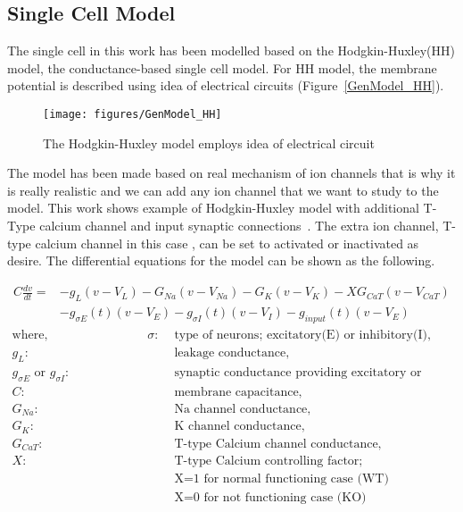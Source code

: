 \subsection{Single Cell Model}

The single cell in this work has been modelled based on the Hodgkin-Huxley(HH) model, the conductance-based single cell model.  For HH model, the membrane potential is described using idea of electrical circuits (Figure~\ref{GenModel_HH}). 
\begin{figure}
	\centering
	\texttt{[image: figures/GenModel\_HH]}
	\label{fig:GenModel_HH}
	\caption{The Hodgkin-Huxley model employs idea of electrical circuit}
\end{figure}


The model has been made based on real mechanism of ion channels that is why it is really realistic and we can add any ion channel that we want to study to the model.  This work shows example of Hodgkin-Huxley model with additional T-Type calcium channel and input synaptic connections~\cite{hodgkin1952quantitative, wang1991model, paik2009spontaneous}. The extra ion channel, T-type calcium channel in this case , can be set to activated or inactivated as desire. The differential equations for the model can be shown as the following.

\begin{align*}
C\frac{dv}{dt}=&-g_L(v - V_L) - G_{Na}(v - V_{Na}) - G_K(v - V_K) - XG_{CaT}(v - V_{CaT}) \\
&- g_{\sigma E}(t)(v - V_E) - g_{\sigma I}(t)(v - V_I) - g_{input}(t)(v - V_E)
\end{align*}
\begin{align*}
	\text{where,} \hspace{8em} \sigma :& \text{ type of neurons; excitatory(E) or inhibitory(I),}  \\
	g_L :& \text{ leakage conductance,} \\
	g_{\sigma E} \text{ or } g_{\sigma I} :& \text{ synaptic conductance providing excitatory or inhibitory input} \\
	C :& \text{ membrane capacitance,}\\
	G_{Na} :& \text{ Na channel conductance,}\\
	G_{K} :& \text{ K channel conductance,}\\
	G_{CaT} :& \text{ T-type Calcium channel conductance,}\\
	X :& \text{ T-type Calcium controlling factor;}\\
	   &  \text{ X=1 for normal functioning case (WT) }\\
	   &  \text{ X=0 for not functioning case (KO) }\\
\end{align*}

